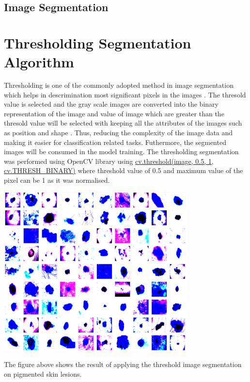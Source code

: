 \subsection{ Image Segmentation }




\section{Thresholding Segmentation Algorithm}

Thresholding is one of the commonly adopted method in image segmentation which helps in descrimination most 
significant pixels in the images \citep{al2010image}. The thresold value is selected and the gray scale images  
are converted into the binary representation of the image and value of image which are greater than the thresold
value will be selected with keeping all the attributes of the images such as position and shape \citep{al2010image}. 
Thus, reducing the complexity of the image data and making it easier for classification related tasks. Futhermore, the 
segmented images will be consumed in the model training. The thresholding segmentation was performed using OpenCV library using 
\url{cv.threshold(image, 0.5, 1, cv.THRESH_BINARY)} where threshold value of 0.5 and maximum value of the pixel can be 1
as it was normalised.

\begin{center}
	\includegraphics[width=10cm]{Images/aseg.png}
\end{center}

The figure above shows the result of applying the threshold image segmentation on pigmented skin lesions. 


